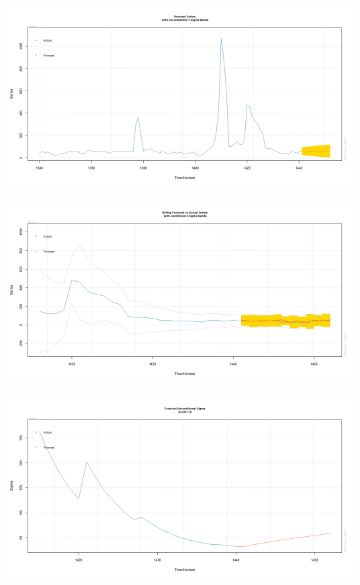 \documentclass[12pt]{article}
\begin{document}
\begin{figure}[H]
  \centering
  \begin{subfigure}[b]{0.49\linewidth}
    \includegraphics[width=\linewidth]{figure28-1.png}
  \end{subfigure}
  \begin{subfigure}[b]{0.49\linewidth}
    \includegraphics[width=\linewidth]{figure28-2.png}
  \end{subfigure}
  \begin{subfigure}[b]{0.49\linewidth}
    \includegraphics[width=\linewidth]{figure28-3.png}
  \end{subfigure}

\end{figure}
\end{document}
